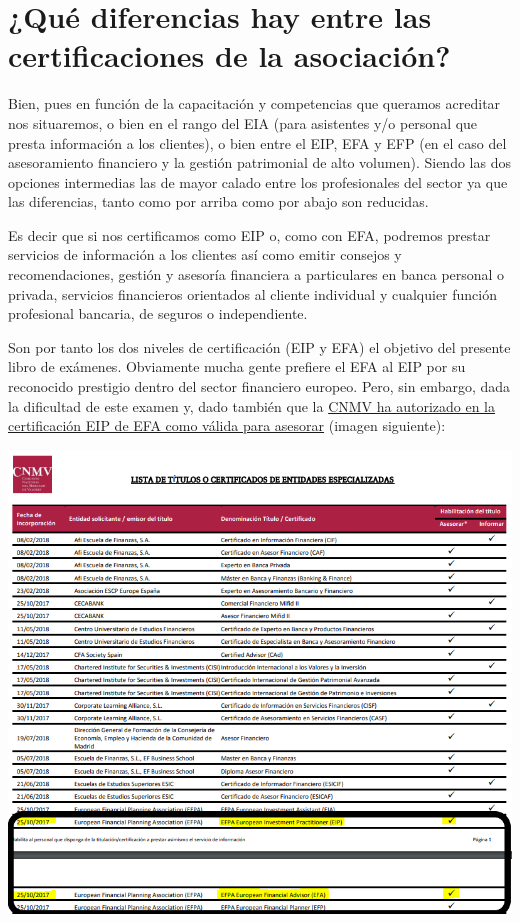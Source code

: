 \documentclass[
  letterpaper,
  DIV=11,
  numbers=noendperiod]{scrreprt}
\begin{document}
\hypertarget{quuxe9-diferencias-hay-entre-las-certificaciones-de-la-asociaciuxf3n}{%
\section*{\texorpdfstring{\textbf{¿Qué diferencias hay entre las
certificaciones de la
asociación?}}{¿Qué diferencias hay entre las certificaciones de la asociación?}}\label{quuxe9-diferencias-hay-entre-las-certificaciones-de-la-asociaciuxf3n}}


Bien, pues en función de la capacitación y competencias que queramos
acreditar nos situaremos, o bien en el rango del EIA (para asistentes
y/o personal que presta información a los clientes), o bien entre el
EIP, EFA y EFP (en el caso del asesoramiento financiero y la gestión
patrimonial de alto volumen). Siendo las dos opciones intermedias las de
mayor calado entre los profesionales del sector ya que las diferencias,
tanto como por arriba como por abajo son reducidas.

Es decir que si nos certificamos como EIP o, como con EFA, podremos
prestar servicios de información a los clientes así como emitir consejos
y recomendaciones, gestión y asesoría financiera a particulares en banca
personal o privada, servicios financieros orientados al cliente
individual y cualquier función profesional bancaria, de seguros o
independiente.

Son por tanto los dos niveles de certificación (EIP y EFA) el objetivo
del presente libro de exámenes. Obviamente mucha gente prefiere el EFA
al EIP por su reconocido prestigio dentro del sector financiero europeo.
Pero, sin embargo, dada la dificultad de este examen y, dado también que
la
\href{http://cnmv.es/Docportal/Legislacion/Titulos/ListadoTitulos.pdf}{CNMV
ha autorizado en la certificación EIP de EFA como válida para asesorar}
(imagen siguiente):

\includegraphics{./images/lista_titulos.png}
\end{document}
